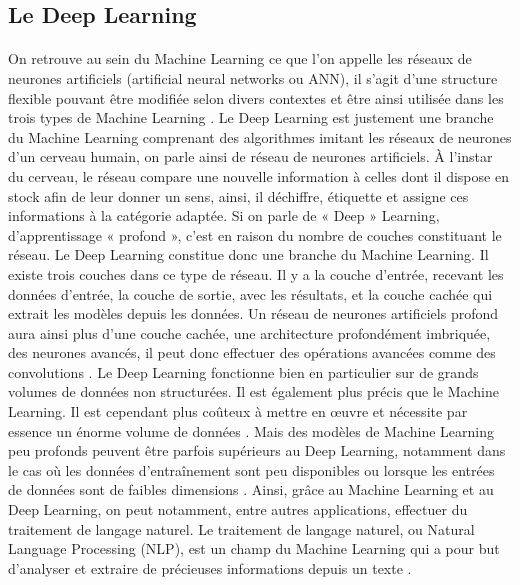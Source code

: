 \documentclass{article}
\begin{document}
\subsection{Le Deep Learning}
\paragraph{}
On retrouve au sein du Machine Learning ce que l’on appelle les réseaux de neurones artificiels (artificial neural networks ou ANN), il s’agit d’une structure flexible pouvant être modifiée selon divers contextes et être ainsi utilisée dans les trois types de Machine Learning \cite[p. 687]{janiesch2021machine}. 
Le Deep Learning est justement une branche du Machine Learning comprenant des algorithmes imitant les réseaux de neurones d’un cerveau humain, on parle ainsi de réseau de neurones artificiels. À l’instar du cerveau, le réseau compare une nouvelle information à celles dont il dispose en stock afin de leur donner un sens, ainsi, il déchiffre, étiquette et assigne ces informations à la catégorie adaptée. Si on parle de « Deep » Learning, d’apprentissage « profond », c’est en raison du nombre de couches constituant le réseau. Le Deep Learning constitue donc une branche du Machine Learning. Il existe trois couches dans ce type de réseau. Il y a la couche d’entrée, recevant les données d’entrée, la couche de sortie, avec les résultats, et la couche cachée qui extrait les modèles depuis les données. Un réseau de neurones artificiels profond aura ainsi plus d’une couche cachée, une architecture profondément imbriquée, des neurones avancés, il peut donc effectuer des opérations avancées comme des convolutions \cite[p. 687]{janiesch2021machine}. Le Deep Learning fonctionne bien en particulier sur de grands volumes de données non structurées. Il est également plus précis que le Machine Learning. Il est cependant plus coûteux à mettre en œuvre et nécessite par essence un énorme volume de données \cite[p. 132]{jakhar2020artificial}. Mais des modèles de Machine Learning peu profonds peuvent être parfois supérieurs au Deep Learning, notamment dans le cas où les données d’entraînement sont peu disponibles ou lorsque les entrées de données sont de faibles dimensions \citep[p. 688]{janiesch2021machine}. 
Ainsi, grâce au Machine Learning et au Deep Learning, on peut notamment, entre autres applications, effectuer du traitement de langage naturel. Le traitement de langage naturel, ou Natural Language Processing (NLP), est un champ du Machine Learning qui a pour but d’analyser et extraire de précieuses informations depuis un texte \cite[p.2]{di2021latin}. 
\end{document}
